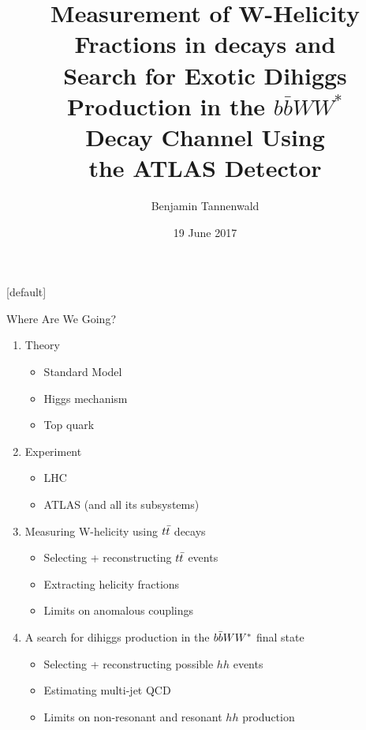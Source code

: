 \documentclass{beamer}
\title{Measurement of W-Helicity\protect\\ Fractions in \ttbar decays and\protect\\ Search for Exotic Dihiggs\protect\\ Production in the \protect \lowercase{$b\bar{b}$}$WW^*$\protect\\ Decay Channel Using\protect\\ the ATLAS Detector}
\subtitle{ }
\author{Benjamin Tannenwald}
\date{19 June 2017}
\newcommand*{\ttbar}{\ensuremath{\lowercase{t\bar{t}}}\xspace}
\newcommand*{\bbWW}{\ensuremath{\lowercase{b\bar{b}}WW^*}\xspace}
\begin{document}
\maketitle

{ %

  \makeatletter %
  [default]
  \def\beamer@entrycode{\vspace*{-1.075\headheight}}
  \begin{frame} {Where Are We Going?}
    \begin{enumerate}
    \item Theory
      \begin{itemize}
      \item Standard Model
      \item Higgs mechanism
      \item Top quark
      \end{itemize}
    \item Experiment
      \begin{itemize}
      \item LHC
       \item ATLAS (and all its subsystems)
      \end{itemize}
    \item Measuring W-helicity using \ttbar decays
      \begin{itemize}
      \item Selecting + reconstructing \ttbar events
      \item Extracting helicity fractions
      \item Limits on anomalous couplings
      \end{itemize}
    \item A search for dihiggs production in the \bbWW final state
      \begin{itemize}
      \item Selecting + reconstructing possible $hh$ events
      \item Estimating multi-jet QCD
      \item Limits on non-resonant and resonant $hh$ production
      \end{itemize}
    \end{enumerate}
  \end{frame}

}
\end{document}
